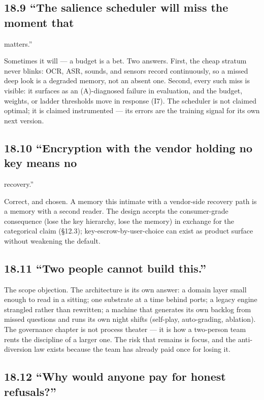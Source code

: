 \subsection{18.9 ``The salience scheduler will miss the moment that}\label{the-salience-scheduler-will-miss-the-moment-that}

matters.''

Sometimes it will --- a budget is a bet. Two answers. First, the cheap stratum never blinks: OCR, ASR, sounds, and sensors record continuously, so a missed deep look is a degraded memory, not an absent one. Second, every such miss is visible: it surfaces as an (A)-diagnosed failure in evaluation, and the budget, weights, or ladder thresholds move in response (I7). The scheduler is not claimed optimal; it is claimed instrumented --- its errors are the training signal for its own next version.

\subsection{18.10 ``Encryption with the vendor holding no key means no}\label{encryption-with-the-vendor-holding-no-key-means-no}

recovery.''

Correct, and chosen. A memory this intimate with a vendor-side recovery path is a memory with a second reader. The design accepts the consumer-grade consequence (lose the key hierarchy, lose the memory) in exchange for the categorical claim (\S{}12.3); key-escrow-by-user-choice can exist as product surface without weakening the default.

\subsection{18.11 ``Two people cannot build this.''}\label{two-people-cannot-build-this.}

The scope objection. The architecture is its own answer: a domain layer small enough to read in a sitting; one substrate at a time behind ports; a legacy engine strangled rather than rewritten; a machine that generates its own backlog from missed questions and runs its own night shifts (self-play, auto-grading, ablation). The governance chapter is not process theater --- it is how a two-person team rents the discipline of a larger one. The risk that remains is focus, and the anti-diversion law exists because the team has already paid once for losing it.

\subsection{18.12 ``Why would anyone pay for honest refusals?''}\label{why-would-anyone-pay-for-honest-refusals}

